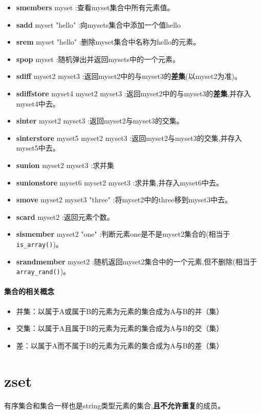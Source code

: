 \documentclass[UTF8,a4paper,12pt]{ctexbook}
\begin{document}
		\begin{itemize}
			\item \textbf{smembers} myset :查看myset集合中所有元素值。
			\item \textbf{sadd} myset "hello" :向mysets集合中添加一个值hello
			\item \textbf{srem} myset "hello" :删除myset集合中名称为hello的元素。
			\item \textbf{spop} myset  :随机弹出并返回mysets中的一个元素。
			\item \textbf{sdiff} myset2 myset3 :返回myset2中的与myset3的\textbf{差集}(以myset2为准)。
			\item \textbf{sdiffstore} myset4 myset2 myset3 :返回myset2中的与myset3的\textbf{差集},并存入myset4中去。
			\item \textbf{sinter} myset2 myset3 :返回myset2与myset3的交集。
			\item \textbf{sinterstore} myset5 myset2 myset3 :返回myset2与myset3的交集,并存入myset5中去。
			\item \textbf{sunion} myset2 myset3 :求并集
			\item \textbf{sunionstore} myset6 myset2 myset3 :求并集,并存入myset6中去。
			\item \textbf{smove} myset2 myset3 "three" :将myset2中的three移到myset3中去。
			\item \textbf{scard} myset2 :返回元素个数。
			\item \textbf{sismember} myset2 "one" :判断元素one是不是myset2集合的(相当于\verb|is_array()|)。
			\item \textbf{srandmember} myset2 :随机返回myset2集合中的一个元素,但不删除(相当于\verb|array_rand()|)。
		\end{itemize}
		
		\paragraph{集合的相关概念}
			\begin{itemize}
				\item 并集：以属于A或属于B的元素为元素的集合成为A与B的并（集） 
				\item 交集：以属于A且属于B的元素为元素的集合成为A与B的交（集） 
				\item 差：以属于A而不属于B的元素为元素的集合成为A与B的差（集）
			\end{itemize}
		
	\section{zset}
		有序集合和集合一样也是string类型元素的集合,\textbf{且不允许重复}的成员。
		
\end{document}
